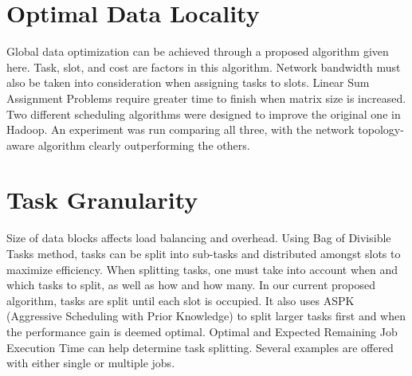 
\section{Optimal Data Locality}

Global data optimization can be achieved through a proposed algorithm
given here. Task, slot, and cost are factors in this algorithm. Network
bandwidth must also be taken into consideration when assigning tasks to
slots. Linear Sum Assignment Problems require greater time to finish
when matrix size is increased. Two different scheduling algorithms were
designed to improve the original one in Hadoop. An experiment was run
comparing all three, with the network topology-aware algorithm clearly
outperforming the others.



\section{Task Granularity}

Size of data blocks affects load balancing and overhead. Using Bag of
Divisible Tasks method, tasks can be split into sub-tasks and
distributed amongst slots to maximize efficiency. When splitting tasks,
one must take into account when and which tasks to split, as well as how
and how many. In our current proposed algorithm, tasks are split until
each slot is occupied. It also uses ASPK (Aggressive Scheduling with
Prior Knowledge) to split larger tasks first and when the performance
gain is deemed optimal. Optimal and Expected Remaining Job Execution
Time can help determine task splitting. Several examples are offered
with either single or multiple jobs.




